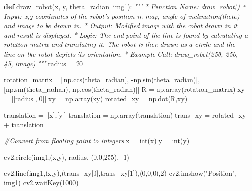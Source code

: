 \documentclass[]{article}
\newenvironment{Shaded}{}{}
\newcommand{\KeywordTok}[1]{\textcolor[rgb]{0.00,0.44,0.13}{\textbf{{#1}}}}
\newcommand{\DecValTok}[1]{\textcolor[rgb]{0.25,0.63,0.44}{{#1}}}
\newcommand{\StringTok}[1]{\textcolor[rgb]{0.25,0.44,0.63}{{#1}}}
\newcommand{\CommentTok}[1]{\textcolor[rgb]{0.38,0.63,0.69}{\textit{{#1}}}}
\newcommand{\OperatorTok}[1]{\textcolor[rgb]{0.40,0.40,0.40}{{#1}}}
\newcommand{\BuiltInTok}[1]{{#1}}
\newcommand{\NormalTok}[1]{{#1}}
\begin{document}
\begin{Shaded}
\begin{Highlighting}[]
\KeywordTok{def} \NormalTok{draw_robot(x, y, theta_radian, img1):}
    \CommentTok{"""}
\CommentTok{    * Function Name:    draw_robot()}
\CommentTok{    * Input:        x,y coordinates of the robot's position in map, angle}
\CommentTok{                        of inclination(theta) and image to be drawn in.}
\CommentTok{    * Output:       Modified image with the robot drawn in it and result is}
\CommentTok{                        displayed.}
\CommentTok{    * Logic:        The end point of the line is found by calculating a}
\CommentTok{                        rotation matrix and translating it. The robot is then}
\CommentTok{                        drawn as a circle and the line on the robot depicts}
\CommentTok{                        its orientation.}
\CommentTok{    * Example Call: draw_robot(250, 250, 45, image)}
\CommentTok{    """}
    \NormalTok{radius }\OperatorTok{=} \DecValTok{20}
    
    \NormalTok{rotation_matrix}\OperatorTok{=} \NormalTok{[[np.cos(theta_radian), }\OperatorTok{-}\NormalTok{np.sin(theta_radian)],}
                      \NormalTok{[np.sin(theta_radian), np.cos(theta_radian)]]}
    \NormalTok{R }\OperatorTok{=} \NormalTok{np.array(rotation_matrix)}
    \NormalTok{xy }\OperatorTok{=} \NormalTok{[[radius],[}\DecValTok{0}\NormalTok{]]}
    \NormalTok{xy }\OperatorTok{=} \NormalTok{np.array(xy)}
    \NormalTok{rotated_xy }\OperatorTok{=} \NormalTok{np.dot(R,xy)}

    \NormalTok{translation }\OperatorTok{=} \NormalTok{[[x],[y]]}
    \NormalTok{translation }\OperatorTok{=} \NormalTok{np.array(translation)}
    \NormalTok{trans_xy }\OperatorTok{=} \NormalTok{rotated_xy }\OperatorTok{+} \NormalTok{translation}

    \CommentTok{#Convert from floating point to integers}
    \NormalTok{x }\OperatorTok{=} \BuiltInTok{int}\NormalTok{(x)}
    \NormalTok{y }\OperatorTok{=} \BuiltInTok{int}\NormalTok{(y)}
    
    \NormalTok{cv2.circle(img1,(x,y), radius, (}\DecValTok{0}\NormalTok{,}\DecValTok{0}\NormalTok{,}\DecValTok{255}\NormalTok{), }\OperatorTok{-}\DecValTok{1}\NormalTok{)}

    \NormalTok{cv2.line(img1,(x,y),(trans_xy[}\DecValTok{0}\NormalTok{],trans_xy[}\DecValTok{1}\NormalTok{]),(}\DecValTok{0}\NormalTok{,}\DecValTok{0}\NormalTok{,}\DecValTok{0}\NormalTok{),}\DecValTok{2}\NormalTok{)}
    \NormalTok{cv2.imshow(}\StringTok{"Position"}\NormalTok{, img1)}
    \NormalTok{cv2.waitKey(}\DecValTok{1000}\NormalTok{)}



\end{Highlighting}
\end{Shaded}
\end{document}
